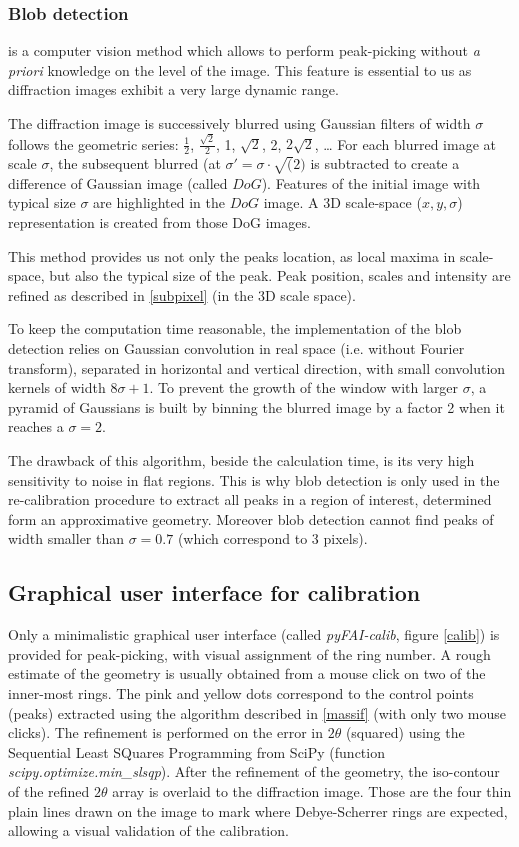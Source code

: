 \documentclass[preprint]{iucr}
\begin{document}
\subsubsection{Blob detection}
\label{blob}
is a computer vision method which allows to perform peak-picking without
\textit{a priori} knowledge on the level of the image.
This feature is essential to us as diffraction images exhibit a very large
dynamic range.

The diffraction image is successively blurred using Gaussian filters of
width $\sigma$ follows the geometric series: $\frac{1}{2}$,
$\frac{\sqrt{2}}{2}$, 1, $\sqrt{2}$, 2, $2\sqrt{2}$, \ldots
For each blurred image at scale $\sigma$, the subsequent blurred (at
$\sigma'=\sigma\cdot\sqrt(2)$
is subtracted to create a difference of Gaussian
image (called $DoG$).
Features of the initial image with typical size $\sigma$ are highlighted in
the $DoG$ image.
A 3D scale-space ($x,y,\sigma$) representation is created from those DoG images.

This method provides us not only the peaks location, as local maxima in
scale-space, but also the typical size of the peak.
Peak position, scales and intensity are refined as described in
\ref{subpixel} (in the 3D scale space).

To keep the computation time reasonable, the implementation of the blob
detection relies on Gaussian convolution in real space (i.e. without Fourier
transform), separated in horizontal and vertical direction, with small
convolution kernels of width $8 \sigma +1$.
To prevent the growth of the window with larger $\sigma$, a pyramid of Gaussians
is built by binning the blurred image by a factor 2 when it reaches a
$\sigma=2$.

The drawback of this algorithm, beside the calculation time, is its very high
sensitivity to noise in flat regions.
This is why blob detection is only used in the re-calibration procedure to
extract all peaks in a region of interest, determined form an
approximative geometry.
Moreover blob detection cannot find peaks of width smaller than
$\sigma=0.7$ (which correspond to 3 pixels).


\subsection{Graphical user interface for calibration}
\label{gui_calib}
Only a minimalistic graphical user interface (called
\textit{pyFAI-calib}, figure \ref{calib}) is provided
for peak-picking, with visual assignment of the ring number.
A rough estimate of the geometry is usually obtained from a mouse click on
two of the inner-most rings.
The pink and yellow dots correspond to the control points (peaks) extracted
using the algorithm described in \ref{massif} (with only two mouse clicks).
The refinement is performed on the error in $2\theta$ (squared) using the
Sequential Least SQuares Programming  from
SciPy (function \textit{scipy.optimize.min\_slsqp}).
After the refinement of the geometry, the iso-contour of the refined $2\theta$ array is
overlaid to the diffraction image. Those are the four thin plain lines drawn on
the image to mark where Debye-Scherrer rings are expected, allowing a visual
validation of the calibration.
\end{document}
